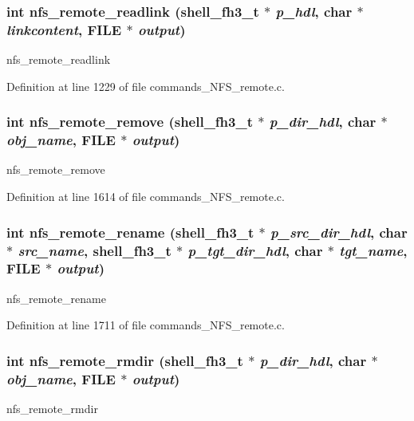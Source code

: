 \subsubsection[{nfs\_\-remote\_\-readlink}]{\setlength{\rightskip}{0pt plus 5cm}int nfs\_\-remote\_\-readlink ({\bf shell\_\-fh3\_\-t} $\ast$ {\em p\_\-hdl}, \/  char $\ast$ {\em linkcontent}, \/  FILE $\ast$ {\em output})}\label{commands__NFS__remote_8c_a35ee345fd17cf4cf06a364b158c52f6f}
nfs\_\-remote\_\-readlink 

Definition at line 1229 of file commands\_\-NFS\_\-remote.c.
\subsubsection[{nfs\_\-remote\_\-remove}]{\setlength{\rightskip}{0pt plus 5cm}int nfs\_\-remote\_\-remove ({\bf shell\_\-fh3\_\-t} $\ast$ {\em p\_\-dir\_\-hdl}, \/  char $\ast$ {\em obj\_\-name}, \/  FILE $\ast$ {\em output})}\label{commands__NFS__remote_8c_a6bf648e474ee81ef7aecebb41c4d107a}
nfs\_\-remote\_\-remove 

Definition at line 1614 of file commands\_\-NFS\_\-remote.c.
\subsubsection[{nfs\_\-remote\_\-rename}]{\setlength{\rightskip}{0pt plus 5cm}int nfs\_\-remote\_\-rename ({\bf shell\_\-fh3\_\-t} $\ast$ {\em p\_\-src\_\-dir\_\-hdl}, \/  char $\ast$ {\em src\_\-name}, \/  {\bf shell\_\-fh3\_\-t} $\ast$ {\em p\_\-tgt\_\-dir\_\-hdl}, \/  char $\ast$ {\em tgt\_\-name}, \/  FILE $\ast$ {\em output})}\label{commands__NFS__remote_8c_ada2fb373c0c44d26d35898c5b124b413}
nfs\_\-remote\_\-rename 

Definition at line 1711 of file commands\_\-NFS\_\-remote.c.
\subsubsection[{nfs\_\-remote\_\-rmdir}]{\setlength{\rightskip}{0pt plus 5cm}int nfs\_\-remote\_\-rmdir ({\bf shell\_\-fh3\_\-t} $\ast$ {\em p\_\-dir\_\-hdl}, \/  char $\ast$ {\em obj\_\-name}, \/  FILE $\ast$ {\em output})}\label{commands__NFS__remote_8c_ab8b37503f4fc0fa700c014b3c600dd2e}
nfs\_\-remote\_\-rmdir 

